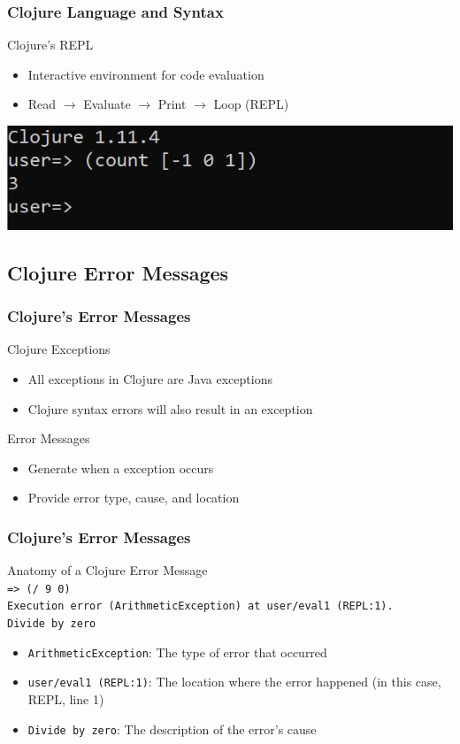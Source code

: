 \documentclass{beamer}
\newcommand{\comment}[1]{{\bf \tt  {#1}}}
\newcommand{\emcomment}[1]{\textcolor{ForestGreen}{\comment{Elena: {#1}}}}
\begin{document}
\begin{frame}
  \frametitle{Clojure Language and Syntax}
  Clojure's REPL
  \begin{itemize}
    \item Interactive environment for code evaluation
    \item Read \(\rightarrow\) Evaluate \(\rightarrow\) Print \(\rightarrow\) Loop (REPL)
  \end{itemize}
  \includegraphics{../resources/cljScreenshot.JPG}
\end{frame}

\subsection{Clojure Error Messages}
\begin{frame}
  \frametitle{Clojure's Error Messages}
  Clojure Exceptions
  \begin{itemize}
    \item All exceptions in Clojure are Java exceptions
    \item Clojure syntax errors will also result in an exception %
  \end{itemize}
  Error Messages
  \begin{itemize}
    \item Generate when a exception occurs
    \item Provide error type, cause, and location
  \end{itemize}
\end{frame}

\begin{frame}
    \frametitle{Clojure's Error Messages}
    Anatomy of a Clojure Error Message \\
    \texttt{=> (/ 9 0)} \\
    \texttt{Execution error (ArithmeticException) at user/eval1 (REPL:1).} \\
    \texttt{Divide by zero}
    \begin{itemize}
      \item \texttt{ArithmeticException}: The type of error that occurred
      \item \texttt{user/eval1 (REPL:1)}: The location where the error happened (in this case, REPL, line 1)
      \item \texttt{Divide by zero}: The description of the error's cause
    \end{itemize}
\end{frame}
\end{document}
